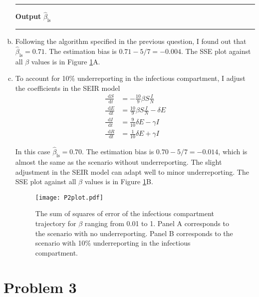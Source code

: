 \documentclass[12pt]{article}
\makeatletter
\newcommand*\diff{\mathop{}\!\mathrm{d}}
\newenvironment{breakablealgorithm}
{%
		\begin{center}
			\refstepcounter{algorithm}%
			\hrule height.8pt depth0pt \kern2pt%
			\renewcommand{\caption}[2][\relax]{%
				{\raggedright\textbf{\fname@algorithm~\thealgorithm} ##2\par}%
				\ifx\relax##1\relax %
				\addcontentsline{loa}{algorithm}{\protect\numberline{\thealgorithm}##2}%
				\else %
				\addcontentsline{loa}{algorithm}{\protect\numberline{\thealgorithm}##1}%
				\fi
				\kern2pt\hrule\kern2pt
			}
		}{%
		\kern2pt\hrule\relax%
	\end{center}
}
\makeatother
\begin{document}
\begin{enumerate}[(a)]
\begin{breakablealgorithm}
	\hspace*{\algorithmicindent} \textbf{Output} $\hat{\beta}_\text{ls}$
\end{breakablealgorithm}

	\item Following the algorithm specified in the previous question, I found out that $\hat{\beta}_\text{ls} = 0.71$. The estimation bias is $0.71 - 5/7 = -0.004$. The SSE plot against all $\beta$ values is in Figure \ref{p2}A.

	
	
	\item To account for 10\% underreporting in the infectious compartment, I adjust the coefficients in the SEIR model
	\begin{align*}
	\frac{\diff S}{\diff t} &= -\frac{10}{9} \beta S \frac{I}{N}\\
	\frac{\diff E}{\diff t} &= \frac{10}{9}\beta S \frac{I}{N} - \delta E\\
	\frac{\diff I}{\diff t} &= \frac{9}{10}\delta E - \gamma I\\
	\frac{\diff R}{\diff t} &= \frac{1}{10}\delta E + \gamma I
	\end{align*}
	
	In this case $\hat{\beta}_\text{ls} = 0.70$. The estimation bias is $0.70 - 5/7 = -0.014$, which is almost the same as the scenario without underreporting. The slight adjustment in the SEIR model can adapt well to minor underreporting. The SSE plot against all $\beta$ values is in Figure \ref{p2}B.
	
	\begin{figure}[htbp]
		\centering
		\texttt{[image: P2plot.pdf]}
		\caption{The sum of squares of error of the infectious compartment trajectory for $\beta$ ranging from 0.01 to 1. Panel A corresponds to the scenario with no underreporting. Panel B corresponds to the scenario with 10\% underreporting in the infectious compartment.}\label{p2}
	\end{figure}
\end{enumerate}



\newpage
\section*{Problem 3}
\end{document}
